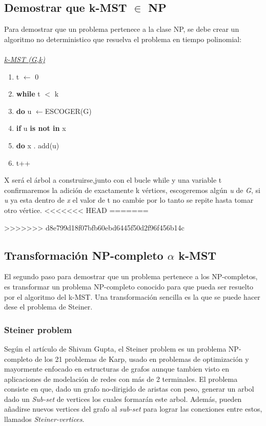 \documentclass[spanish,12pt]{elsarticle}
\newcommand{\blank}[1]{\hspace*{#1}}
\begin{document}
\subsection{Demostrar que k-MST $\in$ NP}
Para demostrar que un problema pertenece a la clase NP, se debe crear un algoritmo no deterministico que resuelva el problema en tiempo polinomial:\\\\
\clearpage
\textit{\underline{k-MST (G,k)} }
\begin{enumerate}
<<<<<<< HEAD
=======


>>>>>>> d8e799d18f07bfb60ebd6445f50d2f96f456b14c
    \item  \textnormal{t $\leftarrow$ 0}
    \item  \textnormal{\textbf{while} t $<$ k}
    \item \textnormal{\blank{1cm}\textbf{do} u $\leftarrow${ESCOGER(G)}}
    \item  \textnormal{\blank{2cm}\textbf{if} u \textbf{is not in} x}
    \item \textnormal{\blank{3cm}\textbf{do} x . add(u)}
     \item \textnormal{\blank{3cm} t++}\\
\end{enumerate}
X será el árbol a construirse,junto con el bucle while y una variable t confirmaremos la adición de  exactamente k vértices, escogeremos algún \textit{u} de \textit{G}, si \textit{u} ya esta dentro de \textit{x} el valor de t no cambie por lo tanto se repite hasta tomar otro vértice.
<<<<<<< HEAD
=======

>>>>>>> d8e799d18f07bfb60ebd6445f50d2f96f456b14c

\subsection{Transformación NP-completo $\alpha$  k-MST}
El segundo paso para demostrar que un problema pertenece a los NP-completos, es transformar un problema NP-completo conocido para que pueda ser resuelto por el algoritmo del k-MST. Una transformación sencilla es la que se puede hacer dese el problema de Steiner.
\subsubsection{Steiner problem}
Según el artículo de Shivam Gupta\cite{2}, el Steiner problem es un problema NP-completo de los 21 problemas de Karp, usado en problemas de optimización y mayormente enfocado en estructuras de grafos aunque tambien visto en aplicaciones de modelación de redes con más de 2 terminales. El problema consiste en que, dado un grafo no-dirigido de aristas con peso, generar un arbol dado un
\textit{Sub-set} de vertices los cuales formarán este arbol. Además, pueden añadirse nuevos vertices del grafo al \textit{sub-set} para lograr las conexiones entre estos, llamados \textit{Steiner-vertices}.\\
\end{document}
